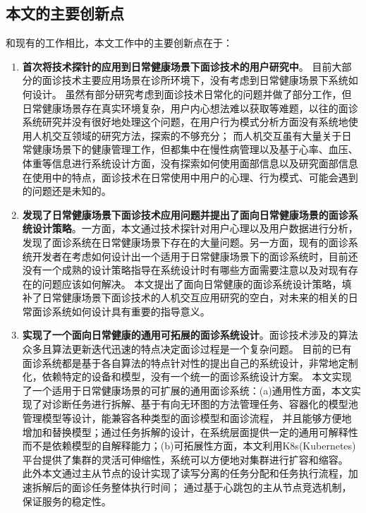 \subsection{本文的主要创新点}
和现有的工作相比，本文工作中的主要创新点在于：
\begin{enumerate}
    \item \textbf{首次将技术探针的应用到日常健康场景下面诊技术的用户研究中}。
    目前大部分的面诊技术主要应用场景在诊所环境下，没有考虑到日常健康场景下系统如何设计。
虽然有部分研究考虑到面诊技术日常化的问题并做了部分工作，但日常健康场景存在真实环境复杂，用户内心想法难以获取等难题，以往的面诊系统研究并没有很好地处理这个问题，在用户行为模式分析方面没有系统地使用人机交互领域的研究方法，探索的不够充分；
而人机交互虽有大量关于日常健康场景下的健康管理工作，但都集中在慢性病管理以及基于心率、血压、体重等信息进行系统设计方面，没有探索如何使用面部信息以及研究面部信息在使用中的特点，面诊技术在日常使用中用户的心理、行为模式、可能会遇到的问题还是未知的。

\item \textbf{发现了日常健康场景下面诊技术应用问题并提出了面向日常健康场景的面诊系统设计策略}。一方面，本文通过技术探针对用户心理以及用户数据进行分析，发现了面诊系统在日常健康场景下存在的大量问题。另一方面，现有的面诊系统开发者在考虑如何设计出一个适用于日常健康场景下的面诊系统时，目前还没有一个成熟的设计策略指导在系统设计时有哪些方面需要注意以及对现有存在的问题应该如何解决。
本文提出了面向日常健康的面诊系统设计策略，填补了日常健康场景下面诊技术的人机交互应用研究的空白\cite{ding2019reading}，对未来的相关的日常面诊系统如何设计具有重要的指导意义。

\item \textbf{实现了一个面向日常健康的通用可拓展的面诊系统设计}。面诊技术涉及的算法众多且算法更新迭代迅速的特点决定面诊过程是一个复杂问题。
    目前的已有面诊系统都是基于各自算法的特点针对性的提出自己的系统设计，非常地定制化，依赖特定的设备和模型，没有一个统一的面诊系统设计方案。
    本文实现了一个适用于日常健康场景的可扩展的通用面诊系统：(a)通用性方面，本文实现了对诊断任务进行拆解、基于有向无环图的方法管理任务、容器化的模型池管理模型等设计，能兼容各种类型的面诊模型和面诊流程，
            并且能够方便地增加和替换模型；通过任务拆解的设计，在系统层面提供一定的通用可解释性而不是依赖模型的自解释能力；(b)可拓展性方面，本文利用K8s(Kubernetes)平台提供了集群的灵活可伸缩性，系统可以方便地对集群进行扩容和缩容。
            此外本文通过主从节点的设计实现了读写分离的任务分配和任务执行流程，加速拆解后的面诊任务整体执行时间；
            通过基于心跳包的主从节点竞选机制，保证服务的稳定性。
\end{enumerate}

